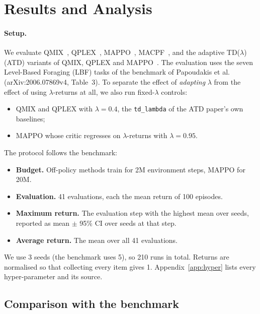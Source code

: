 \section{Results and Analysis}
\label{sec:results}

\paragraph{Setup.}
We evaluate QMIX~\citep{qmix}, QPLEX~\citep{wang2021qplex}, MAPPO~\citep{yu2022mappo},
MACPF~\citep{macpf}, and the adaptive TD($\lambda$) (ATD) variants of QMIX, QPLEX and
MAPPO~\citep{deng2026adaptive}. The evaluation uses the seven Level-Based Foraging (LBF) tasks
of the benchmark of Papoudakis et al.~\citep{test} (arXiv:2006.07869v4, Table~3).
To separate the effect of \emph{adapting} $\lambda$ from the effect of using $\lambda$-returns
at all, we also run fixed-$\lambda$ controls:
\begin{itemize}
  \item QMIX and QPLEX with $\lambda=0.4$, the \texttt{td\_lambda} of the ATD paper's own
        baselines;
  \item MAPPO whose critic regresses on $\lambda$-returns with $\lambda=0.95$.
\end{itemize}
The protocol follows the benchmark:
\begin{itemize}
  \item \textbf{Budget.} Off-policy methods train for 2M environment steps, MAPPO for 20M.
  \item \textbf{Evaluation.} 41 evaluations, each the mean return of 100 episodes.
  \item \textbf{Maximum return.} The evaluation step with the highest mean over seeds, reported
        as mean $\pm$ 95\% CI over seeds at that step.
  \item \textbf{Average return.} The mean over all 41 evaluations.
\end{itemize}
We use 3 seeds (the benchmark uses 5), so 210 runs in total. Returns are normalised so that
collecting every item gives 1. Appendix~\ref{app:hyper} lists every hyper-parameter and its
source.

\subsection{Comparison with the benchmark}

